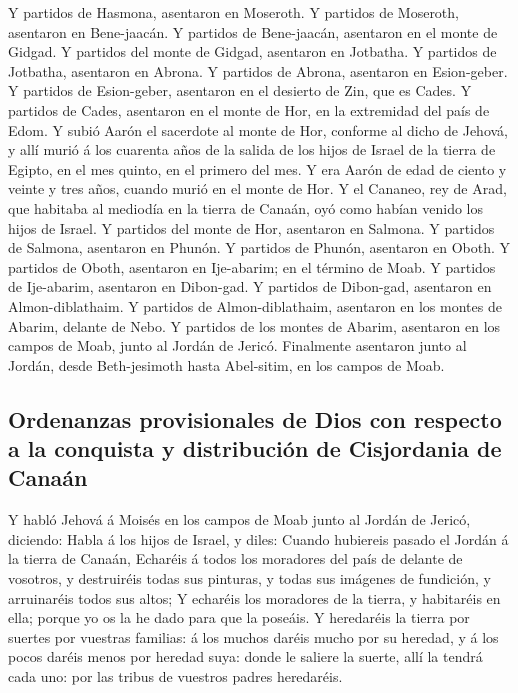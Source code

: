  Y partidos de Hasmona, asentaron en Moseroth.
 Y partidos de Moseroth, asentaron en Bene-jaacán.
 Y partidos de Bene-jaacán, asentaron en el monte de
Gidgad.  Y partidos del monte de Gidgad, asentaron en
Jotbatha.  Y partidos de Jotbatha, asentaron en Abrona.
 Y partidos de Abrona, asentaron en Esion-geber.
 Y partidos de Esion-geber, asentaron en el desierto de
Zin, que es Cades.  Y partidos de Cades, asentaron en el
monte de Hor, en la extremidad del país de Edom.  Y subió
Aarón el sacerdote al monte de Hor, conforme al dicho de Jehová, y allí
murió á los cuarenta años de la salida de los hijos de Israel de la
tierra de Egipto, en el mes quinto, en el primero del mes.
 Y era Aarón de edad de ciento y veinte y tres años,
cuando murió en el monte de Hor.  Y el Cananeo, rey de
Arad, que habitaba al mediodía en la tierra de Canaán, oyó como habían
venido los hijos de Israel.  Y partidos del monte de Hor,
asentaron en Salmona.  Y partidos de Salmona, asentaron
en Phunón.  Y partidos de Phunón, asentaron en Oboth.
 Y partidos de Oboth, asentaron en Ije-abarim; en el
término de Moab.  Y partidos de Ije-abarim, asentaron en
Dibon-gad.  Y partidos de Dibon-gad, asentaron en
Almon-diblathaim.  Y partidos de Almon-diblathaim,
asentaron en los montes de Abarim, delante de Nebo.  Y
partidos de los montes de Abarim, asentaron en los campos de Moab, junto
al Jordán de Jericó.  Finalmente asentaron junto al
Jordán, desde Beth-jesimoth hasta Abel-sitim, en los campos de Moab.

\hypertarget{ordenanzas-provisionales-de-dios-con-respecto-a-la-conquista-y-distribuciuxf3n-de-cisjordania-de-canauxe1n}{%
\subsection{Ordenanzas provisionales de Dios con respecto a la conquista
y distribución de Cisjordania de
Canaán}\label{ordenanzas-provisionales-de-dios-con-respecto-a-la-conquista-y-distribuciuxf3n-de-cisjordania-de-canauxe1n}}

 Y habló Jehová á Moisés en los campos de Moab junto al
Jordán de Jericó, diciendo:  Habla á los hijos de Israel,
y diles: Cuando hubiereis pasado el Jordán á la tierra de Canaán,
 Echaréis á todos los moradores del país de delante de
vosotros, y destruiréis todas sus pinturas, y todas sus imágenes de
fundición, y arruinaréis todos sus altos;  Y echaréis los
moradores de la tierra, y habitaréis en ella; porque yo os la he dado
para que la poseáis.  Y heredaréis la tierra por suertes
por vuestras familias: á los muchos daréis mucho por su heredad, y á los
pocos daréis menos por heredad suya: donde le saliere la suerte, allí la
tendrá cada uno: por las tribus de vuestros padres heredaréis.

